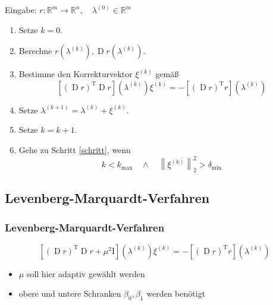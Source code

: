 \documentclass[aspectratio=169]{beamer}
\newcommand{\boxb}[1]{\left[ #1 \right]}
\newcommand{\curvb}[1]{\left( #1 \right)}
\newcommand{\norm}[1]{\left\| #1 \right\|}
\DeclareMathOperator{\Deriv}{\m{D}}
\newcommand{\SR}{\mathds{R}} %
\newcommand{\m}[1]{\mathrm{#1}}
\newcommand{\transp}[1]{{#1}^\m{T}}
\newcommand{\idmat}{\m{I}}
\begin{document}
		\begin{frame}
			
			\begin{tcolorbox}[colframe=black,colbacktitle=white,coltitle=black, attach boxed title to top center={yshift=-2mm},enhanced, titlerule=0.1pt, boxrule=0.5pt, breakable, arc=5pt,title=Algorithmus:\quad Gauß-Newton-Verfahren]
				Eingabe: $r:\SR^m\longrightarrow\SR^n,\quad \lambda^{(0)}\in\SR^m$

				\begin{enumerate}[label=\normalfont (\arabic*)]
					\item Setze $k=0$.
					\item Berechne $r\curvb{\lambda^{(k)}}, \Deriv r\curvb{\lambda^{(k)}}$.
					\label{schritt}
					\item Bestimme den Korrekturvektor $\xi^{(k)}$ gemäß
						\[ \boxb{ \transp{\curvb{\Deriv r}}\Deriv r }\curvb{\lambda^{(k)}} \xi^{(k)} = -\boxb{ \transp{\curvb{\Deriv r}}r }\curvb{\lambda^{(k)}} \]
					\item Setze $\lambda^{(k+1)} = \lambda^{(k)} + \xi^{(k)}$.
					\item Setze $k=k+1$.
					\item Gehe zu Schritt \ref{schritt}, wenn
						\[ k < k_\m{max} \quad \wedge \quad \norm{\xi^{(k)}}_2^2 > \delta_\m{min} \]
				\end{enumerate}
			\end{tcolorbox}

		\end{frame}


	\subsection{Levenberg-Marquardt-Verfahren} %
	\label{sec:levenberg_marquardt_verfahren}
	
		\begin{frame}
			\frametitle{Levenberg-Marquardt-Verfahren}

			\begin{tcolorbox}[title = korrigierte Normalengleichung]
				\[ \boxb{ \transp{\curvb{\Deriv r}}\Deriv r + \mu^2\idmat }\curvb{\lambda^{(k)}} \xi^{(k)} = -\boxb{ \transp{\curvb{\Deriv r}}r }\curvb{\lambda^{(k)}} \]
			\end{tcolorbox}

			\begin{itemize}[label=$\circ$]
				\item $\mu$ soll hier adaptiv gewählt werden
				\item obere und untere Schranken $\beta_0,\beta_1$ werden benötigt
			\end{itemize}
		\end{frame}
\end{document}
